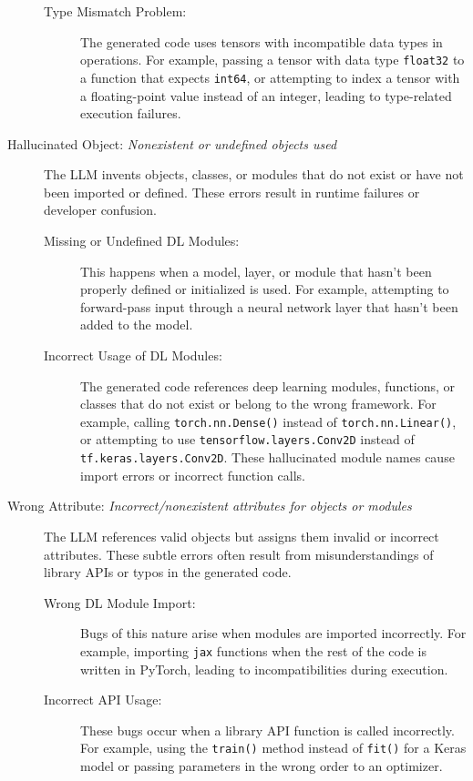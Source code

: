 \begin{description}
\begin{description}
    \item[Type Mismatch Problem:] The generated code uses tensors with incompatible data types in operations. For example, passing a tensor with data type \texttt{float32} to a function that expects \texttt{int64}, or attempting to index a tensor with a floating-point value instead of an integer, leading to type-related execution failures.
\end{description}

\item[Hallucinated Object: \textit{Nonexistent or undefined objects used}] 
The LLM invents objects, classes, or modules that do not exist or have not been imported or defined. These errors result in runtime failures or developer confusion.
\begin{description}
    \item[Missing or Undefined DL Modules:] This happens when a model, layer, or module that hasn’t been properly defined or initialized is used. For example, attempting to forward-pass input through a neural network layer that hasn't been added to the model.
    
    \item[Incorrect Usage of DL Modules:]The generated code references deep learning modules, functions, or classes that do not exist or belong to the wrong framework. For example, calling \texttt{torch.nn.Dense()} instead of \texttt{torch.nn.Linear()}, or attempting to use \texttt{tensorflow.layers.Conv2D} instead of \texttt{tf.keras.layers.Conv2D}. These hallucinated module names cause import errors or incorrect function calls.
\end{description}

\item[Wrong Attribute: \textit{Incorrect/nonexistent attributes for objects or modules}]
The LLM references valid objects but assigns them invalid or incorrect attributes. These subtle errors often result from misunderstandings of library APIs or typos in the generated code.

\begin{description}
 \item[Wrong DL Module Import:] Bugs of this nature arise when modules are imported incorrectly. For example, importing \texttt{jax} functions when the rest of the code is written in PyTorch, leading to incompatibilities during execution.
    \item[Incorrect API Usage:] These bugs occur when a library API function is called incorrectly. For example, using the \texttt{train()} method instead of \texttt{fit()} for a Keras model or passing parameters in the wrong order to an optimizer.
\end{description}


\end{description}
